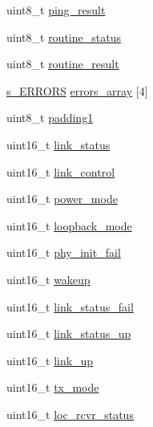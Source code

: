 \begin{DoxyCompactItemize}
\item 
uint8\+\_\+t \mbox{\hyperlink{structdiagnostic_data_msg_q_af2a0714848a69b83e2c3d17d7aeb099e}{ping\+\_\+result}}
\item 
uint8\+\_\+t \mbox{\hyperlink{structdiagnostic_data_msg_q_adb2396af85f9e77dfc948b269866e6f3}{routine\+\_\+status}}
\item 
uint8\+\_\+t \mbox{\hyperlink{structdiagnostic_data_msg_q_a2b67a75dbc3b688426ca1449a3dd58a1}{routine\+\_\+result}}
\item 
\mbox{\hyperlink{__module3_8h_aed782b3a5727361a6b656be14d539f9c}{s\+\_\+\+E\+R\+R\+O\+RS}} \mbox{\hyperlink{structdiagnostic_data_msg_q_a70a56a13a2c9f8f28679b51484db2557}{errors\+\_\+array}} \mbox{[}4\mbox{]}
\item 
uint8\+\_\+t \mbox{\hyperlink{structdiagnostic_data_msg_q_aa5156e3e0221275658d1bdfd3d2299bb}{padding1}}
\item 
uint16\+\_\+t \mbox{\hyperlink{structdiagnostic_data_msg_q_a245d0a07f61d25d2e1ff557b19e70a7d}{link\+\_\+status}}
\item 
uint16\+\_\+t \mbox{\hyperlink{structdiagnostic_data_msg_q_a7e4ef1e3f7dd556bd9e255de7a597157}{link\+\_\+control}}
\item 
uint16\+\_\+t \mbox{\hyperlink{structdiagnostic_data_msg_q_a90060672b628bbc10b2b1ec57bbd70d4}{power\+\_\+mode}}
\item 
uint16\+\_\+t \mbox{\hyperlink{structdiagnostic_data_msg_q_ac850d1259adaa1fedd24a888de52876c}{loopback\+\_\+mode}}
\item 
uint16\+\_\+t \mbox{\hyperlink{structdiagnostic_data_msg_q_a67a92bf1837844081c9116ee8dd9f9b9}{phy\+\_\+init\+\_\+fail}}
\item 
uint16\+\_\+t \mbox{\hyperlink{structdiagnostic_data_msg_q_a8af90f2f6077250420f9c4830906a82f}{wakeup}}
\item 
uint16\+\_\+t \mbox{\hyperlink{structdiagnostic_data_msg_q_ada0ebddb1236e03e2d6d88f1b9258838}{link\+\_\+status\+\_\+fail}}
\item 
uint16\+\_\+t \mbox{\hyperlink{structdiagnostic_data_msg_q_a9c64483015ad9178f27b0123dbf30de8}{link\+\_\+status\+\_\+up}}
\item 
uint16\+\_\+t \mbox{\hyperlink{structdiagnostic_data_msg_q_ae52e94a4412c56455cef23ff03950a84}{link\+\_\+up}}
\item 
uint16\+\_\+t \mbox{\hyperlink{structdiagnostic_data_msg_q_acc9c509a517ee2079aa6ff9de27c61a4}{tx\+\_\+mode}}
\item 
uint16\+\_\+t \mbox{\hyperlink{structdiagnostic_data_msg_q_ae45089c1e314f4e059d58d3a4d5cb3b7}{loc\+\_\+rcvr\+\_\+status}}

\end{DoxyCompactItemize}
